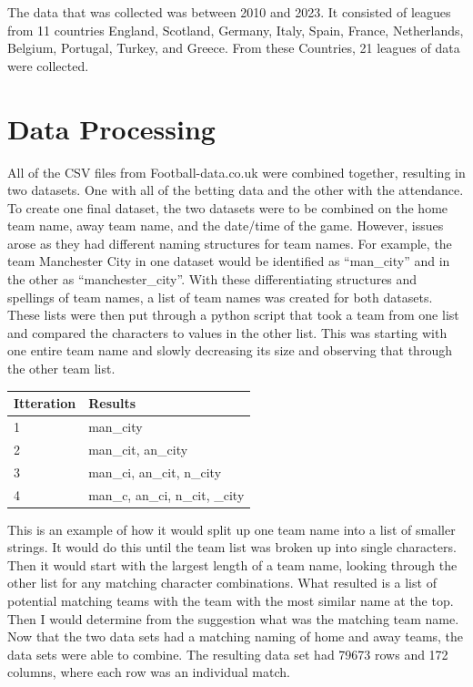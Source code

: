 \documentclass[
  letterpaper,
  DIV=11,
  numbers=noendperiod]{scrartcl}
\begin{document}
The data that was collected was between 2010 and 2023. It consisted of
leagues from 11 countries England, Scotland, Germany, Italy, Spain,
France, Netherlands, Belgium, Portugal, Turkey, and Greece. From these
Countries, 21 leagues of data were collected.

\hypertarget{data-processing}{%
\section{Data Processing}\label{data-processing}}

All of the CSV files from Football-data.co.uk were combined together,
resulting in two datasets. One with all of the betting data and the
other with the attendance. To create one final dataset, the two datasets
were to be combined on the home team name, away team name, and the
date/time of the game. However, issues arose as they had different
naming structures for team names. For example, the team Manchester City
in one dataset would be identified as ``man\_city'' and in the other as
``manchester\_city''. With these differentiating structures and
spellings of team names, a list of team names was created for both
datasets. These lists were then put through a python script that took a
team from one list and compared the characters to values in the other
list. This was starting with one entire team name and slowly decreasing
its size and observing that through the other team list.

\begin{longtable}[]{@{}ll@{}}
\toprule()
Itteration & Results \\
\midrule()
\endhead
1 & man\_city \\
2 & man\_cit, an\_city \\
3 & man\_ci, an\_cit, n\_city \\
4 & man\_c, an\_ci, n\_cit, \_city \\
\bottomrule()
\end{longtable}

This is an example of how it would split up one team name into a list of
smaller strings. It would do this until the team list was broken up into
single characters. Then it would start with the largest length of a team
name, looking through the other list for any matching character
combinations. What resulted is a list of potential matching teams with
the team with the most similar name at the top. Then I would determine
from the suggestion what was the matching team name. Now that the two
data sets had a matching naming of home and away teams, the data sets
were able to combine. The resulting data set had 79673 rows and 172
columns, where each row was an individual match.
\end{document}
